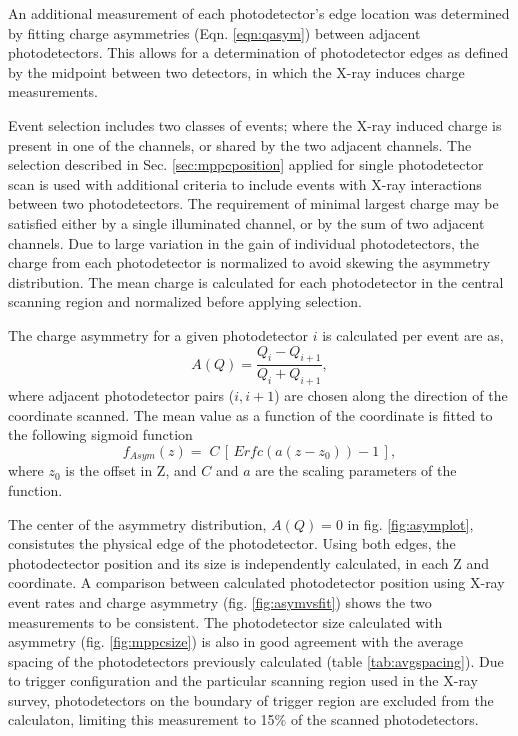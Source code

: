 An additional measurement of each photodetector's edge location was
determined by fitting charge asymmetries (Eqn. \ref{eqn:qasym}) between
adjacent photodetectors. This allows for a determination of
photodetector edges as defined by the midpoint between two detectors,
in which the X-ray induces charge measurements.

Event selection includes two classes of events; where the X-ray
induced charge is present in one of the channels, or shared by the two
adjacent channels.  The selection described in Sec.
\ref{sec:mppcposition} applied for single photodetector scan is used
with additional criteria to include events with X-ray interactions
between two photodetectors.  The requirement of minimal largest charge
may be satisfied either by a single illuminated channel, or by the sum of two adjacent channels.  Due to large variation in the gain
of individual photodetectors, the charge from each photodetector is
normalized to avoid skewing the asymmetry distribution. The mean
charge is calculated for each photodetector in the central scanning
region and normalized before applying selection.

The charge asymmetry for a given photodetector $i$
is calculated per event are as,  
\begin{equation} \label{eqn:qasym}
    A(Q)  = 
\frac{Q_{i}-Q_{i+1}}
     {Q_{i}+Q_{i+1}}, 
\end{equation}
where adjacent photodetector pairs ($i, i+1$) are chosen
along the direction of the coordinate scanned. The mean value
as a function of the coordinate is fitted to the 
following sigmoid function
\begin{equation}\label{eqn:asymfit}
f_{Asym}(z)=\;
C\,\left[\,Erfc(a(z-z_{0}))-1\,\right],
\end{equation} 
where $z_0$ is the offset in Z, and $C$ and $a$ are 
the scaling parameters of the function.

The center of the asymmetry distribution, $A(Q)=0$ in fig.
\ref{fig:asymplot}, consistutes the physical edge of the
photodetector.  Using both edges, the photodectector position and its
size is independently calculated, in each Z and \phis coordinate.  A
comparison between calculated photodetector position using X-ray event
rates and charge asymmetry (fig. \ref{fig:asymvsfit}) shows the two
measurements to be consistent.  The photodetector size calculated with
asymmetry (fig. \ref{fig:mppcsize}) is also in good agreement with the
average spacing of the photodetectors previously calculated (table
\ref{tab:avgspacing}).  Due to trigger configuration and the
particular scanning region used in the X-ray survey, photodetectors on
the boundary of trigger region are excluded from the calculaton,
limiting this measurement to 15\% of the scanned photodetectors.


